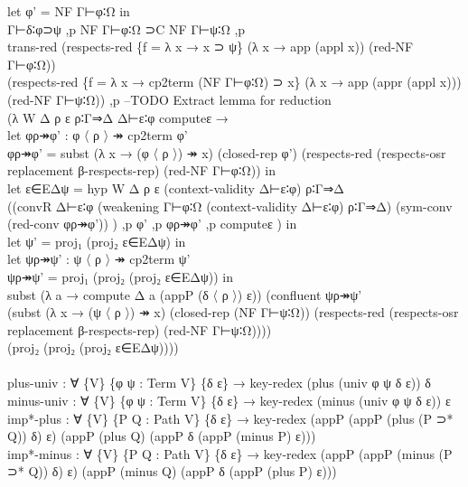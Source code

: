 {\begin{code}
{\>                      let φ' = NF Γ⊢φ∶Ω in\<\\
\>                      Γ⊢δ∶φ⊃ψ ,p NF Γ⊢φ∶Ω ⊃C NF Γ⊢ψ∶Ω ,p \<\\
\>                      trans-red (respects-red \{f = λ x → x ⊃ ψ\} (λ x → app (appl x)) (red-NF Γ⊢φ∶Ω)) \<\\
\>                                (respects-red \{f = λ x → cp2term (NF Γ⊢φ∶Ω) ⊃ x\} (λ x → app (appr (appl x))) (red-NF Γ⊢ψ∶Ω)) ,p  --TODO Extract lemma for reduction\<\\
\>                      (λ W Δ ρ ε ρ∶Γ⇒Δ Δ⊢ε∶φ computeε →\<\\
\>                      let φρ↠φ' : φ 〈 ρ 〉 ↠ cp2term φ'\<\\
\>                          φρ↠φ' = subst (λ x → (φ 〈 ρ 〉) ↠ x) (closed-rep φ') (respects-red (respects-osr replacement β-respects-rep) (red-NF Γ⊢φ∶Ω)) in\<\\
\>                      let ε∈EΔψ = hyp W Δ ρ ε (context-validity Δ⊢ε∶φ) ρ∶Γ⇒Δ        \<\\
\>                                  ((convR Δ⊢ε∶φ (weakening Γ⊢φ∶Ω (context-validity Δ⊢ε∶φ) ρ∶Γ⇒Δ) (sym-conv (red-conv φρ↠φ')) ) ,p φ' ,p φρ↠φ' ,p computeε ) in \<\\
\>                      let ψ' = proj₁ (proj₂ ε∈EΔψ) in \<\\
\>                      let ψρ↠ψ' : ψ 〈 ρ 〉 ↠ cp2term ψ'\<\\
\>                          ψρ↠ψ' = proj₁ (proj₂ (proj₂ ε∈EΔψ)) in \<\\
\>                      subst (λ a → compute Δ a (appP (δ 〈 ρ 〉) ε)) (confluent ψρ↠ψ' \<\\
\>                        (subst (λ x → (ψ 〈 ρ 〉) ↠ x) (closed-rep (NF Γ⊢ψ∶Ω)) (respects-red (respects-osr replacement β-respects-rep) (red-NF Γ⊢ψ∶Ω)))) \<\\
\>                        (proj₂ (proj₂ (proj₂ ε∈EΔψ))))\<\\
\>\<\\
\>  plus-univ : ∀ \{V\} \{φ ψ : Term V\} \{δ ε\} → key-redex (plus (univ φ ψ δ ε)) δ\<\\
\>  minus-univ : ∀ \{V\} \{φ ψ : Term V\} \{δ ε\} → key-redex (minus (univ φ ψ δ ε)) ε\<\\
\>  imp*-plus : ∀ \{V\} \{P Q : Path V\} \{δ ε\} → key-redex (appP (appP (plus (P ⊃* Q)) δ) ε) (appP (plus Q) (appP δ (appP (minus P) ε)))\<\\
\>  imp*-minus : ∀ \{V\} \{P Q : Path V\} \{δ ε\} → key-redex (appP (appP (minus (P ⊃* Q)) δ) ε) (appP (minus Q) (appP δ (appP (plus P) ε)))\<\\
}
\end{code}}
